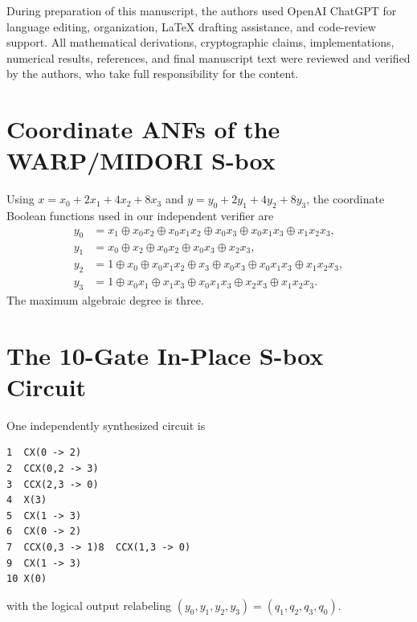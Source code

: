 \documentclass[pdflatex,sn-nature]{sn-jnl}
\theoremstyle{thmstyleone}
\theoremstyle{thmstyletwo}
\begin{document}
During preparation of this manuscript, the authors used OpenAI ChatGPT for language editing, organization, LaTeX drafting assistance, and code-review support. All mathematical derivations, cryptographic claims, implementations, numerical results, references, and final manuscript text were reviewed and verified by the authors, who take full responsibility for the content.


\begin{appendices}
\section{Coordinate ANFs of the WARP/MIDORI S-box}
Using $x=x_0+2x_1+4x_2+8x_3$ and $y=y_0+2y_1+4y_2+8y_3$, the coordinate Boolean functions used in our independent verifier are
\begin{align}
y_0 &= x_1 \oplus x_0x_2 \oplus x_0x_1x_2 \oplus x_0x_3 \oplus x_0x_1x_3 \oplus x_1x_2x_3,\\
y_1 &= x_0 \oplus x_2 \oplus x_0x_2 \oplus x_0x_3 \oplus x_2x_3,\\
y_2 &= 1 \oplus x_0 \oplus x_0x_1x_2 \oplus x_3 \oplus x_0x_3 \oplus x_0x_1x_3 \oplus x_1x_2x_3,\\
y_3 &= 1 \oplus x_0x_1 \oplus x_1x_3 \oplus x_0x_1x_3 \oplus x_2x_3 \oplus x_1x_2x_3.
\end{align}
The maximum algebraic degree is three.

\section{The 10-Gate In-Place S-box Circuit}
One independently synthesized circuit is
\begin{Verbatim}[fontsize=\small]
1  CX(0 -> 2)
2  CCX(0,2 -> 3)
3  CCX(2,3 -> 0)
4  X(3)
5  CX(1 -> 3)
6  CX(0 -> 2)
7  CCX(0,3 -> 1)8  CCX(1,3 -> 0)
9  CX(1 -> 3)
10 X(0)
\end{Verbatim}
with the logical output relabeling $(y_0,y_1,y_2,y_3)=(q_1,q_2,q_3,q_0)$.
\end{appendices}
\end{document}
